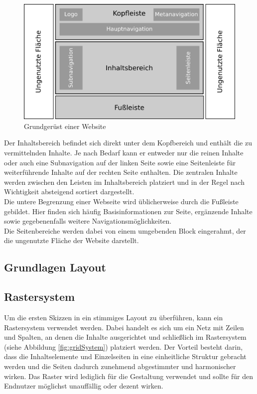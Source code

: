 \begin{figure}[!htb]
    \centering
    \includegraphics[scale=0.8]{figures/jan/Wire_Areas.png}
    \caption[Grundgerüst einer Website]{Grundgerüst einer Website}
    \label{fig:Grundgeruest}
\end{figure}

Der Inhaltsbereich befindet sich direkt unter dem Kopfbereich und enthält die zu vermittelnden Inhalte. Je nach Bedarf kann er entweder nur die reinen Inhalte oder auch eine Subnavigation auf der linken Seite sowie eine Seitenleiste für weiterführende Inhalte auf der rechten Seite enthalten. Die zentralen Inhalte werden zwischen den Leisten im Inhaltsbereich platziert und in der Regel nach Wichtigkeit absteigend sortiert dargestellt. \\
Die untere Begrenzung einer Webseite wird üblicherweise durch die Fußleiste gebildet. Hier finden sich häufig Basisinformationen zur Seite, ergänzende Inhalte sowie gegebenenfalls weitere Navigationsmöglichkeiten. \\
Die Seitenbereiche werden dabei von einem umgebenden Block eingerahmt, der die ungenutzte Fläche der Website darstellt.

\subsection{Grundlagen Layout}
\label{sec:layout}

\subsection{Rastersystem}

Um die ersten Skizzen in ein stimmiges Layout zu überführen, kann ein Rastersystem verwendet werden. Dabei handelt es sich um ein Netz mit Zeilen und Spalten, an denen die Inhalte ausgerichtet und schließlich im Rastersystem (siehe Abbildung \ref{fig:gridSystem}) platziert werden. Der Vorteil besteht darin, dass die Inhaltselemente und Einzelseiten in eine einheitliche Struktur gebracht werden und die Seiten dadurch zunehmend abgestimmter und harmonischer wirken. Das Raster wird lediglich für die Gestaltung verwendet und sollte für den Endnutzer möglichst unauffällig oder dezent wirken.

